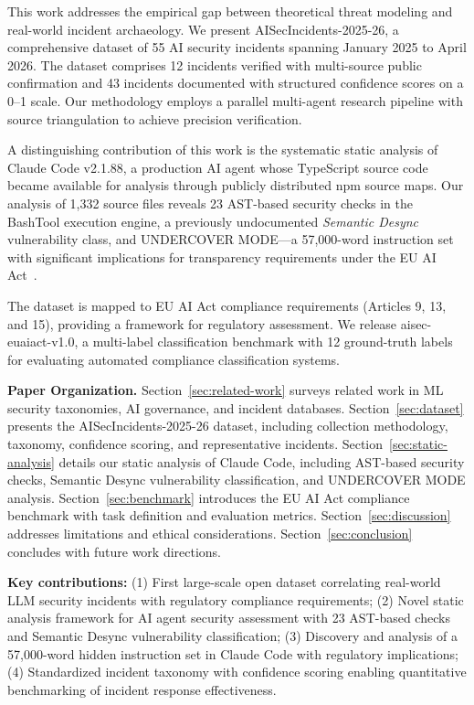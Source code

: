 \documentclass[10pt,conference]{IEEEtran}
\begin{document}
This work addresses the empirical gap between theoretical threat modeling and real-world incident archaeology. We present AISecIncidents-2025-26, a comprehensive dataset of 55 AI security incidents spanning January 2025 to April 2026. The dataset comprises 12 incidents verified with multi-source public confirmation and 43 incidents documented with structured confidence scores on a 0--1 scale. Our methodology employs a parallel multi-agent research pipeline with source triangulation to achieve precision verification.

A distinguishing contribution of this work is the systematic static analysis of Claude Code v2.1.88, a production AI agent whose TypeScript source code became available for analysis through publicly distributed npm source maps. Our analysis of 1,332 source files reveals 23 AST-based security checks in the BashTool execution engine, a previously undocumented \emph{Semantic Desync} vulnerability class, and UNDERCOVER MODE---a 57,000-word instruction set with significant implications for transparency requirements under the EU AI Act~\cite{euaiact2024}.

The dataset is mapped to EU AI Act compliance requirements (Articles 9, 13, and 15), providing a framework for regulatory assessment. We release aisec-euaiact-v1.0, a multi-label classification benchmark with 12 ground-truth labels for evaluating automated compliance classification systems.

\textbf{Paper Organization.} Section~\ref{sec:related-work} surveys related work in ML security taxonomies, AI governance, and incident databases. Section~\ref{sec:dataset} presents the AISecIncidents-2025-26 dataset, including collection methodology, taxonomy, confidence scoring, and representative incidents. Section~\ref{sec:static-analysis} details our static analysis of Claude Code, including AST-based security checks, Semantic Desync vulnerability classification, and UNDERCOVER MODE analysis. Section~\ref{sec:benchmark} introduces the EU AI Act compliance benchmark with task definition and evaluation metrics. Section~\ref{sec:discussion} addresses limitations and ethical considerations. Section~\ref{sec:conclusion} concludes with future work directions.

\textbf{Key contributions:} (1) First large-scale open dataset correlating real-world LLM security incidents with regulatory compliance requirements; (2) Novel static analysis framework for AI agent security assessment with 23 AST-based checks and Semantic Desync vulnerability classification; (3) Discovery and analysis of a 57,000-word hidden instruction set in Claude Code with regulatory implications; (4) Standardized incident taxonomy with confidence scoring enabling quantitative benchmarking of incident response effectiveness.
\end{document}
